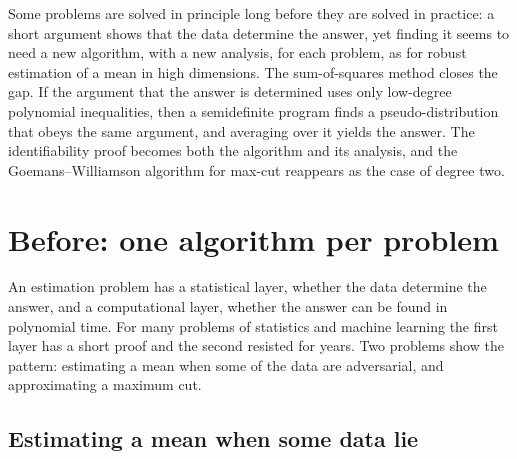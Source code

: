 \newcommand{\sosPE}{\widetilde{\mathbb{E}}}
\newcommand{\sosProves}[1]{\mathrel{\vdash_{#1}}}
\newcommand{\sosGW}{\alpha_{\mathrm{GW}}}
\newcommand{\sosR}{\mathcal{R}}

\begin{refsection}

\begin{chaptersummary}
Some problems are solved in principle long before they are solved in practice: a short argument shows that the data determine the answer, yet finding it seems to need a new algorithm, with a new analysis, for each problem, as for robust estimation of a mean in high dimensions. The sum-of-squares method closes the gap. If the argument that the answer is determined uses only low-degree polynomial inequalities, then a semidefinite program finds a pseudo-distribution that obeys the same argument, and averaging over it yields the answer. The identifiability proof becomes both the algorithm and its analysis, and the Goemans--Williamson algorithm for max-cut reappears as the case of degree two.
\end{chaptersummary}

\section{Before: one algorithm per problem}\label{sec:sos:before}

An estimation problem has a statistical layer, whether the data determine the answer, and a computational layer, whether the answer can be found in polynomial time. For many problems of statistics and machine learning the first layer has a short proof and the second resisted for years. Two problems show the pattern: estimating a mean when some of the data are adversarial, and approximating a maximum cut.

\subsection{Estimating a mean when some data lie}\label{sec:sos:robust-before}


\end{refsection}
